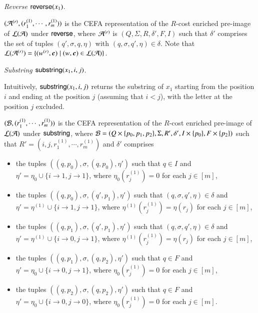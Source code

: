 \smallskip 

\noindent \emph{Reverse $\mathsf{reverse}(x_1)$}. 

$(\mathcal{A}^{(r)}, (r^{(1)}_1, \cdots, r^{(1)}_m))$ is the CEFA representation of the $R$-cost enriched pre-image of $\mathcal{L}(\mathcal{A})$ under $\mathsf{reverse}$, where $\mathcal{A}^{(r)}$ is $(Q, \Sigma, R, \delta', F, I)$ such that $\delta'$ comprises the set of tuples $(q', \sigma, q, \eta)$ with  $(q, \sigma, q', \eta) \in \delta$. Note that $\Lang(\Aut^{(r)}) = \{(w^{(r)}, \vec{c}) \mid (w, \vec{c}) \in \Lang(\Aut)\}$.


\smallskip

\noindent \emph{Substring $\mathsf{substring}(x_1, i, j)$}.

Intuitively, $\mathsf{substring}(x_1, i, j)$ returns the substring of $x_1$ starting from the position $i$ and ending at the position $j$ (assuming that $i  < j$), with the letter at the position $j$ excluded.

$(\mathcal{B}, (r^{(1)}_1, \cdots, r^{(1)}_m))$ is the CEFA representation of the $R$-cost enriched pre-image of $\mathcal{L}(\mathcal{A})$ under $\mathsf{substring}$, where $\mathcal{B} = (Q \times \{p_0, p_1, p_2\}, \Sigma, R', \delta', I \times \{p_0\}, F \times \{p_2\})$ such that $R' = (i, j, r^{(1)}_1,\cdots, r^{(1)}_m)$ and $\delta'$ comprises 
\begin{itemize}
\item the tuples $((q, p_0), \sigma, (q, p_0), \eta')$ such that $q \in I$ and $\eta' = \eta_0 \cup \{i \rightarrow 1, j \rightarrow 1\}$, where $\eta_0(r^{(1)}_j)=0$ for each $j \in [m]$,
%
\item the tuples $((q, p_0), \sigma, (q', p_1), \eta')$ such that $(q, \sigma, q', \eta) \in \delta$ and $\eta' = \eta^{(1)} \cup \{i \rightarrow 1, j  \rightarrow 1\}$, where $\eta^{(1)}(r^{(1)}_j)=\eta(r_j)$ for each $j \in [m]$,
%
\item the tuples $((q, p_1), \sigma, (q', p_1), \eta')$ such that $(q, \sigma, q', \eta) \in \delta$ and $\eta' = \eta^{(1)} \cup \{i \rightarrow 0, j  \rightarrow 1\}$, where $\eta^{(1)}(r^{(1)}_j)=\eta(r_j)$ for each $j \in [m]$,
%
\item the tuples $((q, p_1), \sigma, (q, p_2), \eta')$ such that $q \in F$ and $\eta' = \eta_0 \cup \{i \rightarrow 0, j  \rightarrow 1\}$, where $\eta_0(r^{(1)}_j)=0$ for each $j \in [m]$,
%
\item the tuples $((q, p_2), \sigma, (q, p_2), \eta')$ such that $q \in F$ and $\eta' = \eta_0 \cup \{i \rightarrow 0, j  \rightarrow 0\}$, where $\eta_0(r^{(1)}_j)=0$ for each $j \in [m]$.
%
\end{itemize}
%

